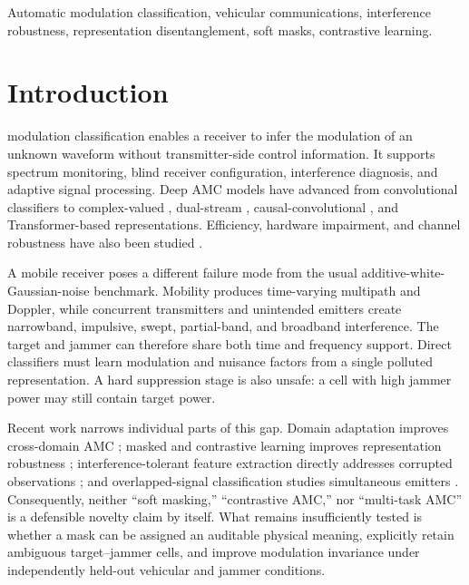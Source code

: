 \documentclass[letterpaper,journal]{IEEEtran}
\newif\ifinternalreview
\begin{document}
\begin{IEEEkeywords}
Automatic modulation classification, vehicular communications, interference
robustness, representation disentanglement, soft masks, contrastive learning.
\end{IEEEkeywords}

\ifinternalreview
\begin{center}
\fcolorbox{red!70!black}{red!5}{%
\parbox{0.94\columnwidth}{\footnotesize\textbf{Evidence lock.}
This build is for internal scientific review.  Em-dash cells are not zeroes
and must not be interpreted as experimental outcomes.  Smoke runs and
fixed-batch overfit diagnostics are excluded from paper claims.}}
\end{center}
\fi

\section{Introduction}
 modulation classification enables a receiver to
infer the modulation of an unknown waveform without transmitter-side control
information.  It supports spectrum monitoring, blind receiver configuration,
interference diagnosis, and adaptive signal processing.  Deep AMC models have
advanced from convolutional classifiers \cite{oshea2016cnn,meng2018amc} to
complex-valued \cite{tu2020complex}, dual-stream \cite{zhang2020dual},
causal-convolutional \cite{tang2024repccnet}, and Transformer-based
\cite{cai2022transformer,shao2025iqformer} representations.  Efficiency,
hardware impairment, and channel robustness have also been studied
\cite{wang2020lightamc,ren2024crosssknet,huang2024csqcc}.

A mobile receiver poses a different failure mode from the usual
additive-white-Gaussian-noise benchmark.  Mobility produces time-varying
multipath and Doppler, while concurrent transmitters and unintended emitters
create narrowband, impulsive, swept, partial-band, and broadband interference.
The target and jammer can therefore share both time and frequency support.
Direct classifiers must learn modulation and nuisance factors from a single
polluted representation.  A hard suppression stage is also unsafe: a cell
with high jammer power may still contain target power.

Recent work narrows individual parts of this gap.  Domain adaptation improves
cross-domain AMC \cite{wang2024sigda,li2026cgpcda}; masked and contrastive
learning improves representation robustness \cite{xiao2024mclhn,
du2025contrastive,wu2026caic}; interference-tolerant feature extraction
directly addresses corrupted observations \cite{sun2025mfenet}; and
overlapped-signal classification studies simultaneous emitters
\cite{jajoo2024overlapped}.  Consequently, neither ``soft masking,''
``contrastive AMC,'' nor ``multi-task AMC'' is a defensible novelty claim by
itself.  What remains insufficiently tested is whether a mask can be assigned
an auditable physical meaning, explicitly retain ambiguous target--jammer
cells, and improve modulation invariance under independently held-out
vehicular and jammer conditions.
\end{document}
